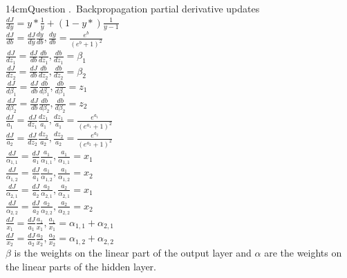 \documentclass[11pt]{article}
\newcommand{\answerderivationheight}{14cm}
\newcounter{QuestionCounter}
\newcounter{SubQuestionCounter}[QuestionCounter]
\newcommand{\subquestiontitle}{Question \theQuestionCounter.\theSubQuestionCounter~}
\begin{document}
{\begin{answerderivation}{\answerderivationheight}{\subquestiontitle Backpropagation partial derivative updates}
$\frac{dJ}{dy} = y*\frac{1}{y} + (1 - y*)\frac{1}{y-1}$\\
$\frac{dJ}{db} = \frac{dJ}{dy}\frac{dy}{db}, \frac{dy}{db} = \frac{e^b}{(e^b + 1)^2}$\\
$\frac{dJ}{dz_1} = \frac{dJ}{db}\frac{db}{dz_1}, \frac{db}{dz_1} = \beta_1$\\
$\frac{dJ}{dz_2} = \frac{dJ}{db}\frac{db}{dz_2}, \frac{db}{dz_2} = \beta_2$\\
$\frac{dJ}{d\beta_1} = \frac{dJ}{db}\frac{db}{d\beta_1}, \frac{db}{d\beta_1} = z_1$\\
$\frac{dJ}{d\beta_2} = \frac{dJ}{db}\frac{db}{d\beta_2}, \frac{db}{d\beta_2} = z_2$\\
$\frac{dJ}{a_1} = \frac{dJ}{dz_1}\frac{dz_1}{a_1}, \frac{dz_1}{a_1} = \frac{e^{a_1}}{(e^{a_1} + 1)^2}$\\
$\frac{dJ}{a_2} = \frac{dJ}{dz_2}\frac{dz_2}{a_2}, \frac{dz_2}{a_2} = \frac{e^{a_2}}{(e^{a_2} + 1)^2}$\\
$\frac{dJ}{\alpha_{1,1}} = \frac{dJ}{a_1}\frac{a_1}{\alpha_{1,1}}, \frac{a_1}{\alpha_{1,1}} = x_1$\\
$\frac{dJ}{\alpha_{1,2}} = \frac{dJ}{a_1}\frac{a_1}{\alpha_{1,2}}, \frac{a_1}{\alpha_{1,2}} = x_2$\\
$\frac{dJ}{\alpha_{2,1}} = \frac{dJ}{a_2}\frac{a_2}{\alpha_{2,1}}, \frac{a_2}{\alpha_{2,1}} = x_1$\\
$\frac{dJ}{\alpha_{2,2}} = \frac{dJ}{a_2}\frac{a_2}{\alpha_{2,2}}, \frac{a_2}{\alpha_{2,2}} = x_2$\\
$\frac{dJ}{x_1} = \frac{dJ}{a_1}\frac{a_1}{x_1}, \frac{a_1}{x_1} = \alpha_{1,1} + \alpha_{2,1}$\\
$\frac{dJ}{x_2} = \frac{dJ}{a_2}\frac{a_2}{x_2}, \frac{a_2}{x_2} = \alpha_{1,2} + \alpha_{2,2}$\\
$\beta$ is the weights on the linear part of the output layer and $\alpha$ are the weights on the linear parts of the hidden layer.
\end{answerderivation}

}


\newpage
\end{document}
